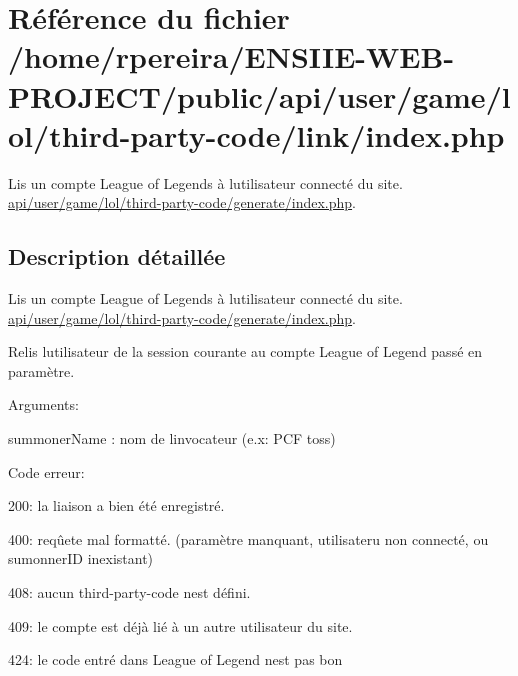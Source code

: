 \hypertarget{game_2lol_2third-party-code_2link_2index_8php}{}\section{Référence du fichier /home/rpereira/\+E\+N\+S\+I\+I\+E-\/\+W\+E\+B-\/\+P\+R\+O\+J\+E\+C\+T/public/api/user/game/lol/third-\/party-\/code/link/index.php}
\label{game_2lol_2third-party-code_2link_2index_8php}


Lis un compte League of Legends à l\textquotesingle{}utilisateur connecté du site. \hyperlink{game_2lol_2third-party-code_2generate_2index_8php}{api/user/game/lol/third-\/party-\/code/generate/index.\+php}.  




\subsection{Description détaillée}
Lis un compte League of Legends à l\textquotesingle{}utilisateur connecté du site. \hyperlink{game_2lol_2third-party-code_2generate_2index_8php}{api/user/game/lol/third-\/party-\/code/generate/index.\+php}. 

Relis l\textquotesingle{}utilisateur de la session courante au compte League of Legend passé en paramètre.

Arguments\+:
\begin{DoxyItemize}
\item summoner\+Name \+: nom de l\textquotesingle{}invocateur (e.\+x\+: \textquotesingle{}P\+CF toss\textquotesingle{})
\end{DoxyItemize}

Code erreur\+:
\begin{DoxyItemize}
\item 200\+: la liaison a bien été enregistré.
\item 400\+: reqûete mal formatté. (paramètre manquant, utilisateru non connecté, ou sumonner\+ID inexistant)
\item 408\+: aucun third-\/party-\/code n\textquotesingle{}est défini.
\item 409\+: le compte est déjà lié à un autre utilisateur du site.
\item 424\+: le code entré dans League of Legend n\textquotesingle{}est pas bon
\end{DoxyItemize}



